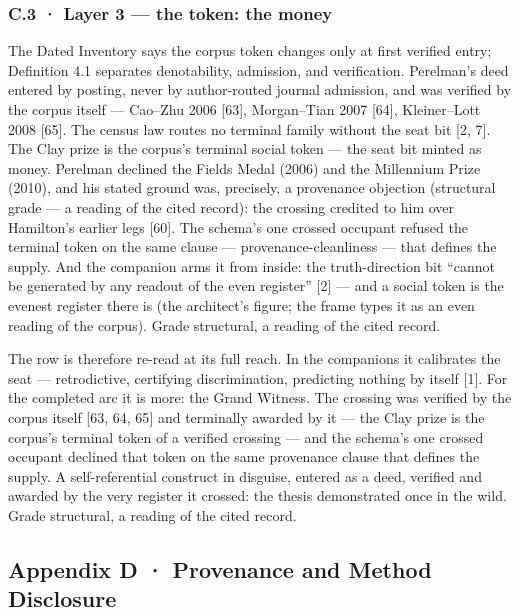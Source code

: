 \documentclass[10pt]{article}
\renewcommand{\_}{\origunderscore\allowbreak}
\begin{document}
\hypertarget{c.3-layer-3-the-token-the-money}{%
\subsubsection{C.3 · Layer 3 --- the token: the
money}\label{c.3-layer-3-the-token-the-money}}

The Dated Inventory says the corpus token changes only at first verified
entry; Definition 4.1 separates denotability, admission, and
verification. Perelman's deed entered by posting, never by author-routed
journal admission, and was verified by the corpus itself --- Cao--Zhu
2006 {[}63{]}, Morgan--Tian 2007 {[}64{]}, Kleiner--Lott 2008 {[}65{]}.
The census law routes no terminal family without the seat bit {[}2,
7{]}. The Clay prize is the corpus's terminal social token --- the seat
bit minted as money. Perelman declined the Fields Medal (2006) and the
Millennium Prize (2010), and his stated ground was, precisely, a
provenance objection (structural grade --- a reading of the cited
record): the crossing credited to him over Hamilton's earlier legs
{[}60{]}. The schema's one crossed occupant refused the terminal token
on the same clause --- provenance-cleanliness --- that defines the
supply. And the companion arms it from inside: the truth-direction bit
``cannot be generated by any readout of the even register'' {[}2{]} ---
and a social token is the evenest register there is (the architect's
figure; the frame types it as an even reading of the corpus). Grade
structural, a reading of the cited record.

The row is therefore re-read at its full reach. In the companions it
calibrates the seat --- retrodictive, certifying discrimination,
predicting nothing by itself {[}1{]}. For the completed arc it is more:
the Grand Witness. The crossing was verified by the corpus itself {[}63,
64, 65{]} and terminally awarded by it --- the Clay prize is the
corpus's terminal token of a verified crossing --- and the schema's one
crossed occupant declined that token on the same provenance clause that
defines the supply. A self-referential construct in disguise, entered as
a deed, verified and awarded by the very register it crossed: the thesis
demonstrated once in the wild. Grade structural, a reading of the cited
record.

\hypertarget{appendix-d-provenance-and-method-disclosure}{%
\subsection{Appendix D · Provenance and Method
Disclosure}\label{appendix-d-provenance-and-method-disclosure}}
\end{document}
